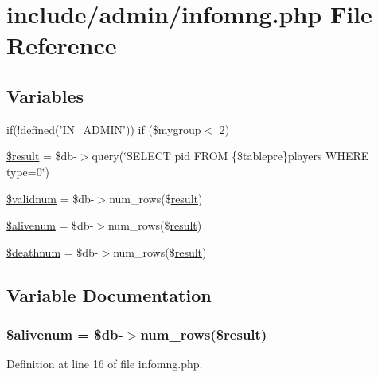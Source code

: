 \hypertarget{infomng_8php}{\section{include/admin/infomng.php File Reference}
\label{infomng_8php}
}
\subsection*{Variables}
\begin{DoxyCompactItemize}
\item 
if(!defined('\hyperlink{admin_8php_ad49472b0cdee543164375bf133a537f1}{I\+N\+\_\+\+A\+D\+M\+I\+N}')) \hyperlink{infomng_8php_aa93bb0e22ba7aba2dc84d85bda19b4a4}{if} (\$mygroup$<$ 2)
\item 
\hyperlink{infomng_8php_a112ef069ddc0454086e3d1e6d8d55d07}{\$result} = \$db-\/$>$query(\char`\"{}S\+E\+L\+E\+C\+T pid F\+R\+O\+M \{\$tablepre\}players W\+H\+E\+R\+E type=0\char`\"{})
\item 
\hyperlink{infomng_8php_a54f1a166645794ce06e05051071a0d53}{\$validnum} = \$db-\/$>$num\+\_\+rows(\$\hyperlink{templates_2install_8php_abdecde238169a1e34f68354fc9968af0}{result})
\item 
\hyperlink{infomng_8php_af96bde4637269c1f0053ba4ac66a8f87}{\$alivenum} = \$db-\/$>$num\+\_\+rows(\$\hyperlink{templates_2install_8php_abdecde238169a1e34f68354fc9968af0}{result})
\item 
\hyperlink{infomng_8php_ac8cccc0e21ebd6828150700b1436a5f8}{\$deathnum} = \$db-\/$>$num\+\_\+rows(\$\hyperlink{templates_2install_8php_abdecde238169a1e34f68354fc9968af0}{result})
\end{DoxyCompactItemize}


\subsection{Variable Documentation}
\hypertarget{infomng_8php_af96bde4637269c1f0053ba4ac66a8f87}{
\subsubsection[{\$alivenum}]{\setlength{\rightskip}{0pt plus 5cm}\$alivenum = \$db-\/$>$num\+\_\+rows(\${\bf result})}}\label{infomng_8php_af96bde4637269c1f0053ba4ac66a8f87}


Definition at line 16 of file infomng.\+php.

